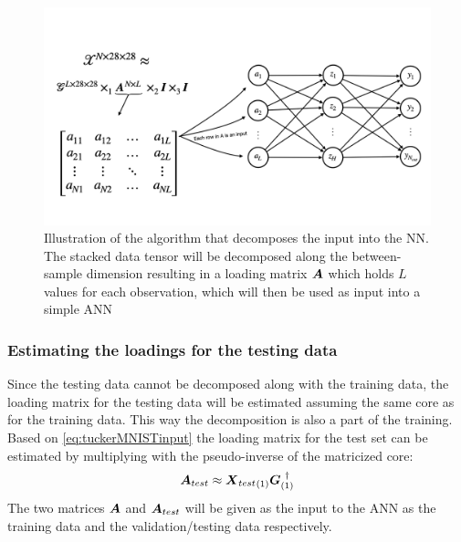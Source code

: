 \begin{figure}
    \centering
    \includegraphics[width=\linewidth]{Pics/05_methodology/input_decomp_illustration.png}
    \captionsetup{width=.95\linewidth}
    \caption{Illustration of the algorithm that decomposes the input into the NN. The stacked data tensor will be decomposed along the between-sample dimension resulting in a loading matrix $\boldsymbol{A}$ which holds $L$ values for each observation, which will then be used as input into a simple ANN}
    \label{fig:illustrationinputdecomp}
\end{figure}

\subsubsection{Estimating the loadings for the testing data}
Since the testing data cannot be decomposed along with the training data, the loading matrix for the testing data will be estimated assuming the same core as for the training data. This way the decomposition is also a part of the training. Based on \eqref{eq:tuckerMNISTinput} the loading matrix for the test set can be estimated by multiplying with the pseudo-inverse of the matricized core:
\begin{equation}
    \boldsymbol{A}_{test} \approx {\boldsymbol{X}_{test}}_{(1)} \boldsymbol{G}_{(1)}^{\ \dagger}
\end{equation}
The two matrices $\boldsymbol{A}$ and $\boldsymbol{A}_{test}$ will be given as the input to the ANN as the training data and the validation/testing data respectively.



